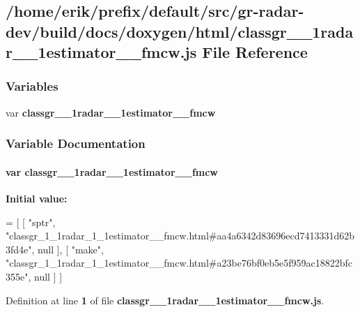 \subsection{/home/erik/prefix/default/src/gr-\/radar-\/dev/build/docs/doxygen/html/classgr\+\_\+\_\+1radar\+\_\+\_\+1estimator\+\_\+\+\_\+fmcw.js File Reference}
\label{classgr__1__1radar__1__1estimator____fmcw_8js}
\subsubsection*{Variables}
\begin{DoxyCompactItemize}
\item 
var {\bf classgr\+\_\+\_\+1radar\+\_\+\_\+1estimator\+\_\+\+\_\+fmcw}
\end{DoxyCompactItemize}


\subsubsection{Variable Documentation}
\paragraph[{classgr\+\_\+1\+\_\+1radar\+\_\+1\+\_\+1estimator\+\_\+\+\_\+fmcw}]{\setlength{\rightskip}{0pt plus 5cm}var classgr\+\_\+\_\+1radar\+\_\+\_\+1estimator\+\_\+\+\_\+fmcw}\label{classgr__1__1radar__1__1estimator____fmcw_8js_a69edd8506bd587bb1c020c4dca9338d6}
{\bfseries Initial value\+:}
\begin{DoxyCode}
=
[
    [ \textcolor{stringliteral}{"sptr"}, \textcolor{stringliteral}{"classgr\_1\_1radar\_1\_1estimator\_\_fmcw.html#aa4a6342d83696ecd7413331d62b3fd4e"}, null ],
    [ \textcolor{stringliteral}{"make"}, \textcolor{stringliteral}{"classgr\_1\_1radar\_1\_1estimator\_\_fmcw.html#a23be76bf0eb5e5f959ac18822bfc355e"}, null ]
]
\end{DoxyCode}


Definition at line {\bf 1} of file {\bf classgr\+\_\+\_\+1radar\+\_\+\_\+1estimator\+\_\+\+\_\+fmcw.\+js}.

